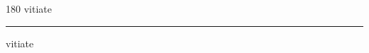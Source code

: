 
\begin{frame}
\begin{center}
\begin{turn}{180}
{\fontsize{2.5cm}{1em}\selectfont vitiate}
\end{turn}
\vspace{1em}\par  
\hrule
\vspace{1em}\par  
{\fontsize{2.5cm}{1em}\selectfont vitiate}
\end{center}
\end{frame}
